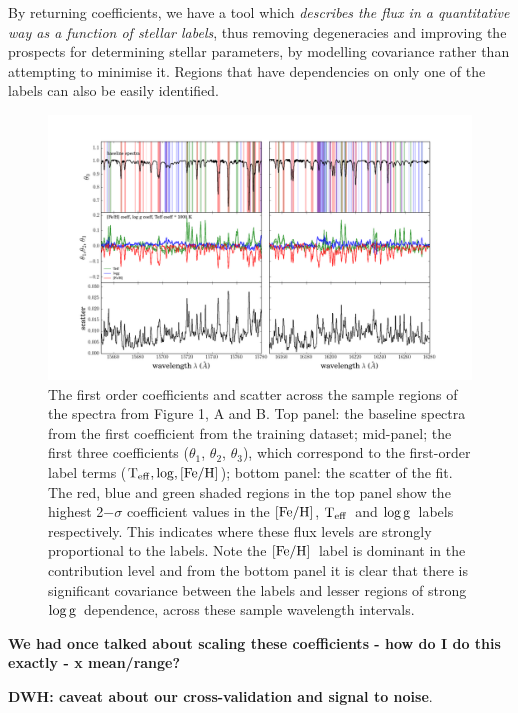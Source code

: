 \documentclass[12pt, preprint]{aastex}
\newcommand{\teff}{\mbox{$\rm T_{eff}$}}
\newcommand{\feh}{\mbox{$\rm [Fe/H]$}}
\newcommand{\logg}{\mbox{$\rm \log g$}}
\begin{document}
By returning coefficients, we have a tool which \textit{describes the flux in a quantitative way as a function of stellar labels}, thus removing degeneracies and improving the prospects for determining stellar parameters, by modelling covariance rather than attempting to minimise it. Regions that have dependencies on only one of the labels can also be easily identified. 

\begin{figure}[h!]
\centering
    \includegraphics[width=\hsize]{./plots/R1_continuum4.png}
  \caption{The first order coefficients and scatter across the sample regions of the spectra from Figure 1, A and B. Top panel: the baseline spectra from the first coefficient from the training dataset; mid-panel; the first three coefficients ($\theta_1$, $\theta_2$, $\theta_3$),  which correspond to the first-order label terms ($\teff, \log, \feh$); bottom panel: the scatter of the fit.  The red, blue and green shaded regions in the top panel show the highest 2$-\sigma$ coefficient values in the \feh, \teff\ and \logg\ labels respectively. This indicates where these flux levels are strongly proportional to the labels. Note the \feh\ label is dominant in the contribution level and from the bottom panel it is clear that there is significant covariance between the labels and lesser regions of strong \logg\ dependence, across these sample wavelength intervals.}
\label{fig:coeffs}
\end{figure}
\textbf{We had once talked about scaling these coefficients - how do I do this exactly - x mean/range?}




\textbf{DWH: caveat about our cross-validation and signal to noise}. 
\end{document}
